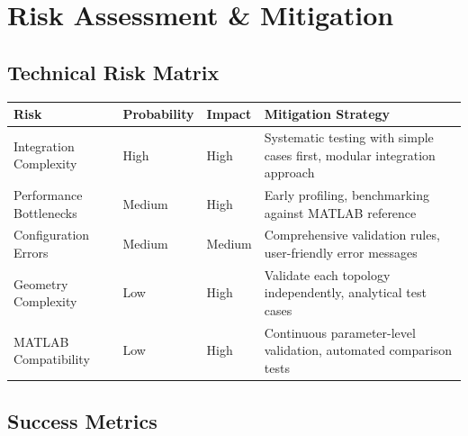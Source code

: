 \documentclass[11pt,a4paper]{article}
\begin{document}
\section{Risk Assessment \& Mitigation}

\subsection{Technical Risk Matrix}

\begin{longtable}{|p{3cm}|p{2cm}|p{2cm}|p{6cm}|}
\hline
\textbf{Risk} & \textbf{Probability} & \textbf{Impact} & \textbf{Mitigation Strategy} \\
\hline
\endhead

Integration Complexity & High & High & Systematic testing with simple cases first, modular integration approach \\
\hline

Performance Bottlenecks & Medium & High & Early profiling, benchmarking against MATLAB reference \\
\hline

Configuration Errors & Medium & Medium & Comprehensive validation rules, user-friendly error messages \\
\hline

Geometry Complexity & Low & High & Validate each topology independently, analytical test cases \\
\hline

MATLAB Compatibility & Low & High & Continuous parameter-level validation, automated comparison tests \\
\hline

\end{longtable}

\subsection{Success Metrics}
\end{document}
